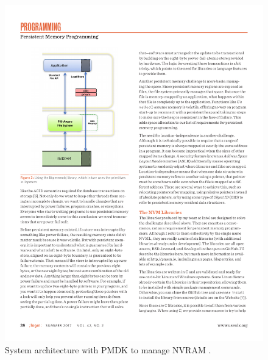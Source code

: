 \begin{figure}[h!]
    \centering
    \includegraphics[scale=1]{figures/nvram/pmdk-sys-arch-extract.pdf}
    \caption{System architecture with PMDK to manage NVRAM \cite{rudoff2017persistent}.}
    \label{fig:pmdk-sys}
\end{figure}

